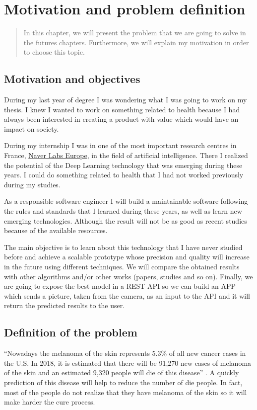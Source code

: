 \chapter{Motivation and problem definition}

\begin{abstract}
In this chapter, we will present the problem that we are going to solve in the futures chapters. Furthermore, we will explain my motivation in order to choose this topic. 
\end{abstract}

\section{Motivation and objectives}

During my last year of degree I was wondering what I was going to work on my thesis. I knew I wanted to work on something related to health because I had always been interested in creating a product with value which would have an impact on society.

During my internship I was in one of the most important research centres in France, \href{http://www.europe.naverlabs.com}{Naver Labs Europe}, in the field of artificial intelligence. There I realized the potential of the Deep Learning technology that was emerging during these years. I could do something related to health that I had not worked previously during my studies.

As a responsible software engineer I will build a maintainable software following the rules and standards that I learned during these years, as well as learn new emerging technologies. Although the result will not be as good as  
recent studies because of the available resources.

The main objective is to learn about this technology that I have never studied before and achieve a scalable prototype whose precision and quality will increase in the future using different techniques. We will compare the obtained results with other algorithms and/or other works (papers, studies and so on). Finally, we are going to expose the best model in a REST API so we can build an APP which sends a picture, taken from the camera, as an input to the API and it will return the predicted results to the user.


\section{Definition of the problem}
``Nowadays the melanoma of the skin represents 5.3\% of all new cancer cases in the U.S. In 2018, it is estimated that there will be 91,270 new cases of melanoma of the skin and an estimated 9,320 people will die of this disease'' \cite{melanoma-stadistics}. A quickly prediction of this disease will help to reduce the number of die people. In fact, most of the people do not realize that they have melanoma of the skin so it will make harder the cure process. 

